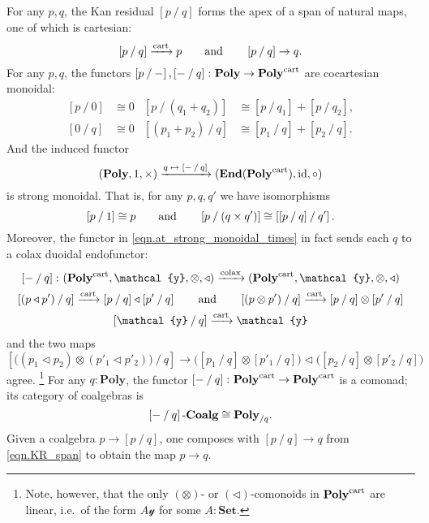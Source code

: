 \documentclass[11pt, one side, article]{memoir}
\theoremstyle{definition}
\theoremstyle{plain}
\newcommand{\Cat}[1]{\mathbf{#1}}%
\newcommand{\id}{\mathrm{id}}
\newcommand{\To}[2][]{\xrightarrow[#1]{\tn{$#2$}}}
\newcommand{\tn}[1]{\textnormal{#1}}
\newcommand{\smset}{\Cat{Set}}
\newcommand{\End}{\Cat{End}}
\newcommand{\yon}{{\mathcal{y}}}
\newcommand{\poly}{\Cat{Poly}}
\newcommand{\cart}{\tn{cart}}
\newcommand{\tocart}{\To{\cart}}
\newcommand{\polycart}{\poly^\cart}
\newcommand{\0}{\textsf{0}}
\newcommand{\1}{\tn{\textsf{1}}}
\newcommand{\tri}{\mathbin{\triangleleft}}
\newcommand{\at}[2]{\left[#1\mathbin{/}#2\right]}
\newcommand{\hh}[2][]{#1 \tn{#2} #1}
\newcommand{\qqand}{\hh[\qquad]{and}}
\newcommand{\coalg}{\tn{-}\Cat{Coalg}}
\begin{document}
For any $p,q$, the Kan residual $\at{p}{q}$ forms the apex of a span of natural maps, one of which is cartesian:
\begin{equation}\label{eqn.KR_span}
  \at{p}{q}\tocart p
  \qqand
  \at{p}{q}\to q.
\end{equation}
For any $p,q$, the functors $\at{p}{-},\at{-}{q}\colon\poly\to\polycart$ are cocartesian monoidal:
\begin{align}
\label{eqn.at_add}
\at{p}{0}&\cong 0
&
\at{p}{(q_1+q_2)}&\cong \at{p}{q_1}+\at{p}{q_2},\\
\at{0}{q}&\cong 0
&\label{eqn.at_add2}
\at{(p_1+p_2)}{q}&\cong \at{p_1}{q}+\at{p_2}{q}.
\end{align}
And the induced functor 
\begin{equation}\label{eqn.at_strong_monoidal_times}
(\poly,1,\times)\To{q\mapsto\at{-}{q}}(\End(\polycart),\id,\circ)
\end{equation}
is strong monoidal. That is, for any $p,q,q'$ we have isomorphisms
\begin{equation}\label{eqn.at_p_1}
	\at{p}{1}\cong p
	\qqand
	\at{p}{( q\times q')}\cong \at{\at{p}{q}}{q'}.
\end{equation}
Moreover, the functor in \eqref{eqn.at_strong_monoidal_times} in fact sends each $q$ to a colax duoidal endofunctor:
\begin{gather}
	\at{-}{q}\colon(\polycart,\yon,\otimes, \tri)\To{\tn{colax}}(\polycart,\yon,\otimes, \tri)\\
	\at{(p\tri p')}{q}\tocart\at{p}{q}\tri\at{p'}{q}
	\qqand
	\at{(p\otimes p')}{q}\tocart\at{p}{q}\otimes\at{p'}{q}\\
	\at{\yon}{q}\tocart\yon
\end{gather}
and the two maps $\at{\big((p_1\tri p_2)\otimes(p'_1\tri p'_2)\big)}{q}\to\big(\at{p_1}{q}\otimes\at{p'_1}{q}\big)\tri\big(\at{p_2}{q}\otimes\at{p'_2}{q}\big)$ agree.%
\footnote{Note, however, that the only $(\otimes)$- or $(\tri)$-comonoids in $\polycart$ are linear, i.e.\ of the form $A\yon$ for some $A:\smset$.}
For any $q:\poly$, the functor $\at{-}{q}\colon\polycart\to\polycart$ is a comonad; its category of coalgebras is
\begin{equation}\label{eqn.at_q_coalg_poly_over_q}
	\at{-}{q}\coalg\cong\poly_{/q}.
\end{equation}
Given a coalgebra $p\to\at{p}{q}$, one composes with $\at{p}{q}\to q$ from \eqref{eqn.KR_span} to obtain the map $p\to q$.
\end{document}
